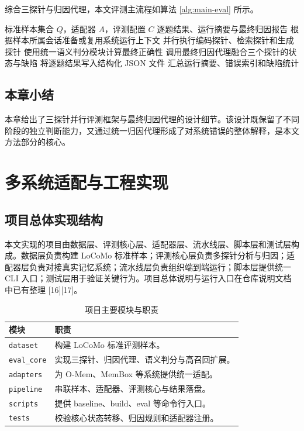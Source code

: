 综合三探针与归因代理，本文评测主流程如算法 \ref{alg:main-eval} 所示。

\begin{algorithm}[htbp]
\caption{长期记忆系统统一评测流程}
\label{alg:main-eval}
\begin{algorithmic}[1]
\REQUIRE 标准样本集合 $Q$，适配器 $A$，评测配置 $C$
\ENSURE 逐题结果、运行摘要与最终归因报告
    \STATE 根据样本所属会话准备或复用系统运行上下文
    \STATE 并行执行编码探针、检索探针和生成探针
    \STATE 使用统一语义判分模块计算最终正确性
    \STATE 调用最终归因代理融合三个探针的状态与缺陷
    \STATE 将逐题结果写入结构化 JSON 文件
\ENDFOR
\STATE 汇总运行摘要、错误索引和缺陷统计
\end{algorithmic}
\end{algorithm}

\section{本章小结}

本章给出了三探针并行评测框架与最终归因代理的设计细节。该设计既保留了不同阶段的独立判断能力，又通过统一归因代理形成了对系统错误的整体解释，是本文方法部分的核心。

\chapter{多系统适配与工程实现}

\section{项目总体实现结构}

本文实现的项目由数据层、评测核心层、适配器层、流水线层、脚本层和测试层构成。数据层负责构建 LoCoMo 标准样本；评测核心层负责多探针分析与归因；适配器层负责对接真实记忆系统；流水线层负责组织端到端运行；脚本层提供统一 CLI 入口；测试层用于验证关键行为。项目总体说明与运行入口在仓库说明文档中已有整理 [16][17]。

\begin{table}[htbp]
\centering
\caption{项目主要模块与职责}
\label{tab:modules}
\begin{tabular}{p{}p{}}
\toprule
模块 & 职责 \\
\midrule
\texttt{dataset} & 构建 LoCoMo 标准评测样本。 \\
\texttt{eval\_core} & 实现三探针、归因代理、语义判分与高召回扩展。 \\
\texttt{adapters} & 为 O-Mem、MemBox 等系统提供统一适配。 \\
\texttt{pipeline} & 串联样本、适配器、评测核心与结果落盘。 \\
\texttt{scripts} & 提供 baseline、build、eval 等命令行入口。 \\
\texttt{tests} & 校验核心状态转移、归因规则和适配器注册。 \\
\bottomrule
\end{tabular}
\end{table}

